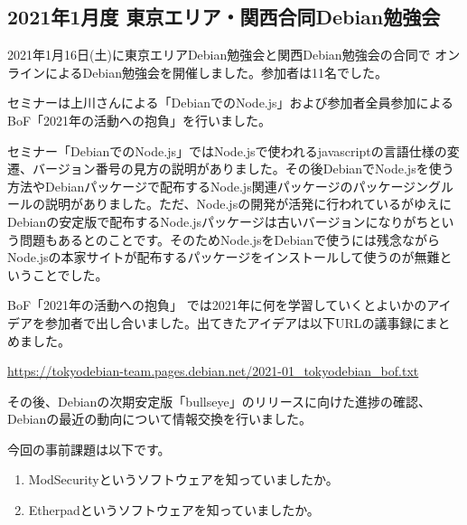 \documentclass[mingoth,a4paper]{jsarticle}
\begin{document}
\subsection{2021年1月度 東京エリア・関西合同Debian勉強会}

2021年1月16日(土)に東京エリアDebian勉強会と関西Debian勉強会の合同で
オンラインによるDebian勉強会を開催しました。参加者は11名でした。

セミナーは上川さんによる「DebianでのNode.js」および参加者全員参加によるBoF「2021年の活動への抱負」を行いました。

セミナー「DebianでのNode.js」ではNode.jsで使われるjavascriptの言語仕様の変遷、バージョン番号の見方の説明がありました。その後DebianでNode.jsを使う方法やDebianパッケージで配布するNode.js関連パッケージのパッケージングルールの説明がありました。ただ、Node.jsの開発が活発に行われているがゆえにDebianの安定版で配布するNode.jsパッケージは古いバージョンになりがちという問題もあるとのことです。そのためNode.jsをDebianで使うには残念ながらNode.jsの本家サイトが配布するパッケージをインストールして使うのが無難ということでした。

BoF「2021年の活動への抱負」 では2021年に何を学習していくとよいかのアイデアを参加者で出し合いました。出てきたアイデアは以下URLの議事録にまとめました。

\url{https://tokyodebian-team.pages.debian.net/2021-01_tokyodebian_bof.txt}

その後、Debianの次期安定版「bullseye」のリリースに向けた進捗の確認、
Debianの最近の動向について情報交換を行いました。


今回の事前課題は以下です。

\begin{enumerate}
\item ModSecurityというソフトウェアを知っていましたか。
\item Etherpadというソフトウェアを知っていましたか。
\end{enumerate}


\begin{multicols}{2}
{\small

}
\end{multicols}

%
%
%
%
\end{document}
